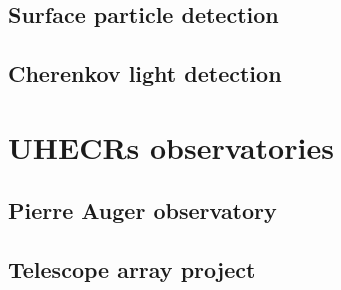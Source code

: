 \subsection{Surface particle detection}

\subsection{Cherenkov light detection}


\section{UHECRs observatories}
\subsection{Pierre Auger observatory}

\subsection{Telescope array project}
